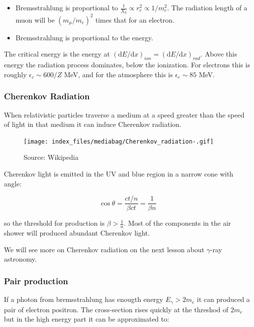 \documentclass[
  letterpaper,
  DIV=11,
  numbers=noendperiod]{scrreprt}
\providecommand{\tightlist}{%
  \setlength{\itemsep}{0pt}\setlength{\parskip}{0pt}}\usepackage{longtable,booktabs,array}
\begin{document}
\begin{itemize}
\tightlist
\item
  Bremsstrahlung is proportional to
  \(\frac{1}{X_0} \propto r^2_{e} \propto 1/m_e^2\). The radiation
  length of a muon will be \((m_\mu/m_e)^2\) times that for an electron.
\item
  Bremsstrahlung is proportional to the energy.
\end{itemize}

The critical energy is the energy at
\((\mathrm{ d}E/\mathrm{ d}x)_{ion} = (\mathrm{ d}E/\mathrm{ d}x)_{rad}\).
Above this energy the radiation process dominates, below the ionization.
For electrons this is roughly \(\epsilon_c \sim 600/Z\) MeV, and for the
atmosphere this is \(\epsilon_e \sim 85\) MeV.

\subsubsection{Cherenkov Radiation}\label{cherenkov-radiation}

When relativistic particles traverse a medium at a speed greater than
the speed of light in that medium it can induce Cherenkov radiation.

\begin{figure}[H]

{\centering \texttt{[image: index\_files/mediabag/Cherenkov\_radiation-.gif]}

}

\caption{Source: Wikipedia}

\end{figure}%

Cherenkov light is emitted in the UV and blue region in a narrow cone
with angle:

\[\cos \theta = \frac{ct/n}{\beta c t} = \frac{1}{\beta n}\]

so the threshold for production is \(\beta > \frac{1}{n}\). Most of the
components in the air shower will produced abundant Cherenkov light.

We will see more on Cherenkov radiation on the next lesson about
\(\gamma\)-ray astronomy.

\subsubsection{Pair production}\label{pair-production}

If a photon from bremsstrahlung has enougth energy \(E_\gamma > 2 m_e\)
it can produced a pair of electron positron. The cross-section rises
quickly at the threshod of \(2 m_e\) but in the high energy part it can
be approximated to:
\end{document}
